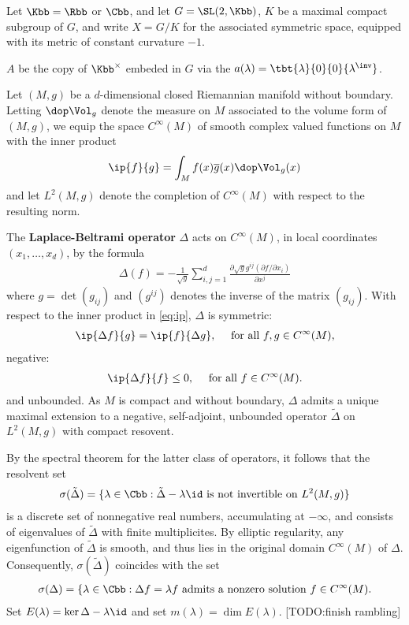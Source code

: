 Let $\Kbb = \Rbb$ or $\Cbb$, and let $G=\SL(2,\Kbb)$, $K$ be a maximal compact subgroup of $G$, and write $X = G/K$ for the associated symmetric space, equipped with its metric of constant curvature $-1$.

$A$ be the copy of $\Kbb^\times$ embeded in $G$ via the $a(\lambda) = \tbt{\lambda}{0}{0}{\lambda^\inv}$.





\newpage
Let $(M,g)$ be a $d$-dimensional closed Riemannian manifold without boundary.  Letting $\dop \Vol_g$ denote the measure on $M$ associated to the volume form of $(M,g)$, we equip the space $C^\infty(M)$ of smooth complex valued functions on $M$ with the inner product
\begin{align}\label{eq:ip}
    \ip{f}{g} = \int_M f(x) \overline{g}(x) \dop \Vol_g(x)
\end{align}
and let $L^2(M,g)$ denote the completion of $C^\infty(M)$ with respect to the resulting norm.

The \textbf{Laplace-Beltrami operator} $\Delta$ acts on $C^\infty(M)$, in local coordinates $(x_1,\dots,x_d)$, by the formula
\begin{align}
    \Delta(f) = -\frac{1}{\sqrt{g}} \sum_{i,j=1}^d \frac{\partial \sqrt{g} g^{ij} (\partial f / \partial x_i)}{\partial x^j}
\end{align}
where $g = \det(g_{ij})$ and $(g^{ij})$ denotes the inverse of the matrix $(g_{ij})$. With respect to the inner product in \ref{eq:ip}, $\Delta$ is symmetric:
\begin{align*}
    \ip{\Delta f}{g} =\ip{ f}{\Delta g}, \quad \text{ for all $f,g \in C^\infty(M)$,}
\end{align*}
negative:
\begin{align*}
    \ip{\Delta f }{f} \leq 0, \quad \text{ for all $f \in C^\infty(M)$.}
\end{align*}
and unbounded. As $M$ is compact and without boundary, $\Delta$ admits a unique maximal extension to a negative, self-adjoint, unbounded operator  $\tilde{\Delta}$ on $L^2(M,g)$ with compact resovent.

By the spectral theorem for the latter class of operators, it follows that the resolvent set
\begin{align*}
    \sigma(\tilde{\Delta}) = \{ \lambda \in \Cbb : \tilde{\Delta} - \lambda \id \text{ is not invertible on $L^2(M,g)$}\}
\end{align*}
is a discrete set of nonnegative real numbers, accumulating at $-\infty$, and consists of eigenvalues of $\tilde{\Delta}$ with finite multiplicites. By elliptic regularity, any eigenfunction of $\tilde{\Delta}$ is smooth, and thus lies in the original domain $C^\infty(M)$ of $\Delta$. Consequently, $\sigma(\tilde{\Delta})$ coincides with the set
\begin{align*}
    \sigma(\Delta) = \{\lambda \in \Cbb : \Delta f  = \lambda f \text{ admits a nonzero  solution  $f \in C^\infty(M)$}.
\end{align*}
Set $E(\lambda) = \ker \Delta - \lambda \id$ and set $m(\lambda) = \dim E(\lambda)$. [TODO:finish rambling]

